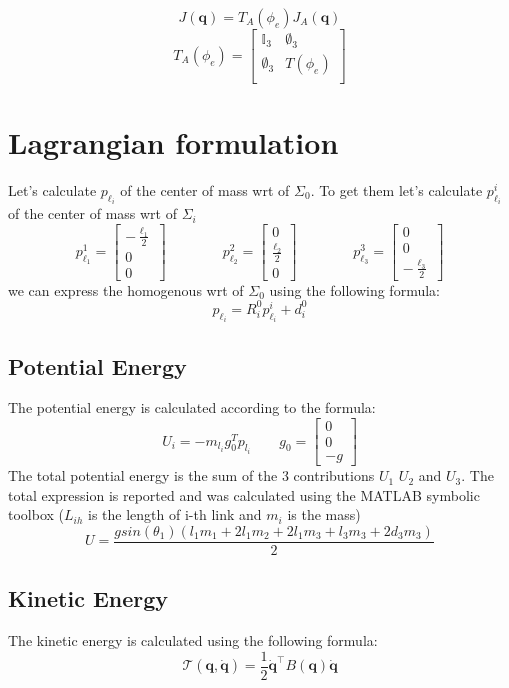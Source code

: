 \documentclass[a4paper,12pt]{article}
\renewcommand*{\l}{\ell}
\newcommand*{\T}{^\top}
\newcommand*{\I}{\mathbb{I}}
\newcommand*{\q}{\bm{q}}
\newcommand*{\dotq}{\dot{\q}}
\begin{document}
\[
J(\q) = T_A(\phi_e) J_A(\q)
\]
\[
T_A(\phi_e) = \begin{bmatrix}
    \I_3 & \emptyset_3 \\ 
\emptyset_3 &     T(\phi_e) \\
\end{bmatrix}
\]

\section{Lagrangian formulation}
Let's calculate $p_{\l_i}$ of the center of mass wrt of $\Sigma_0$. To get them let's calculate $p^i_{\l_i}$ of the center of mass wrt of $\Sigma_i$
\[
p_{\l_1}^{1} = \begin{bmatrix}  - \frac{\l_1}{2} \\ 0 \\ 0 \end{bmatrix}
\qquad
\qquad
p_{\l_2}^{2} = \begin{bmatrix} 0 \\ \frac{\l_2}{2} \\ 0 \end{bmatrix}
\qquad
\qquad
p_{\l_3}^{3} = \begin{bmatrix} 0 \\ 0 \\  - \frac{\l_3}{2} \end{bmatrix}
\]
we can express the homogenous wrt of $\Sigma_0$ using the following formula: 
\[
p_{\l_i} = R^0_i p_{\l_i}^{i}  +  d^0_i
\] 

\subsection{Potential Energy}
The potential energy is calculated according to the formula:
\[
    U_i = -m_{l_i}g_0^{T}p_{l_i}
    \qquad
    g_0 = \begin{bmatrix}
        0\\ 0 \\ -g
    \end{bmatrix}
\]
\noindent The total potential energy is the sum of the 3 contributions $U_1$ $U_2$ and $U_3$. The total expression is reported and was calculated using the MATLAB symbolic toolbox ($L_{ih}$ is the length of i-th link and $m_i$ is the mass)
\[
    U = \frac{gsin(\theta_1)(l_{1}m_1 + 2l_{1}m_2 + 2l_{1}m_3 + l_{3}m_3 + 2d_3m_3)}{2}  
\]

\subsection{Kinetic Energy}
The kinetic energy is calculated using the following formula:
\[
\mathcal{T}(\q,\dotq) = \frac{1}{2}\dotq\T B(\q) \dotq
\]
\end{document}
